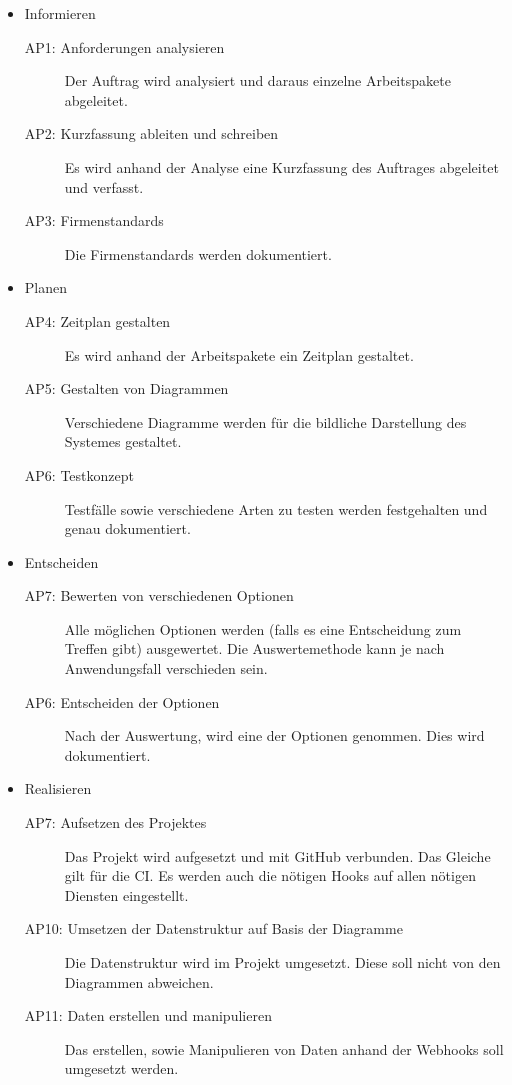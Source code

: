 \begin{itemize}
    \item Informieren
    \begin{description}
        \item[AP1: Anforderungen analysieren] Der Auftrag wird analysiert und daraus einzelne Arbeitspakete abgeleitet. 
        \item[AP2: Kurzfassung ableiten und schreiben] Es wird anhand der Analyse eine Kurzfassung des Auftrages abgeleitet und verfasst.
        \item[AP3: Firmenstandards] Die Firmenstandards werden dokumentiert.
    \end{description}
    \item Planen
    \begin{description}
        \item[AP4: Zeitplan gestalten] Es wird anhand der Arbeitspakete ein Zeitplan gestaltet.
        \item[AP5: Gestalten von Diagrammen] Verschiedene Diagramme werden für die bildliche Darstellung des Systemes gestaltet.
        \item[AP6: Testkonzept] Testfälle sowie verschiedene Arten zu testen werden festgehalten und genau dokumentiert.
    \end{description}
    \item Entscheiden
    \begin{description}
        \item[AP7: Bewerten von verschiedenen Optionen] Alle möglichen Optionen werden (falls es eine Entscheidung zum Treffen gibt) ausgewertet. Die Auswertemethode kann je nach Anwendungsfall verschieden sein.
        \item[AP6: Entscheiden der Optionen] Nach der Auswertung, wird eine der Optionen genommen. Dies wird dokumentiert.
    \end{description}
    \item Realisieren
    \begin{description}
        \item[AP7: Aufsetzen des Projektes] Das Projekt wird aufgesetzt und mit GitHub verbunden. Das Gleiche gilt für die CI. \newline
        Es werden auch die nötigen \gls{Hooks} auf allen nötigen Diensten eingestellt.
        \item[AP10: Umsetzen der Datenstruktur auf Basis der Diagramme] Die Datenstruktur wird im Projekt umgesetzt. Diese soll nicht von den Diagrammen abweichen.
        \item[AP11: Daten erstellen und manipulieren] Das erstellen, sowie Manipulieren von Daten anhand der Webhooks soll umgesetzt werden.

\end{description}
\end{itemize}
